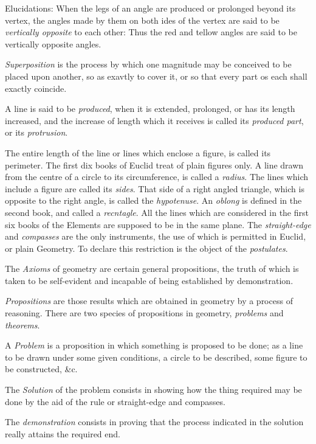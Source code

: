 \documentclass{article}
\begin{document}
Elucidations: 
When the legs of an angle are produced or prolonged beyond its vertex, the angles made by them on both ides of the vertex are said to be \textit{vertically opposite} to each other: Thus the red and tellow angles are said to be vertically opposite angles. 

\textit{Superposition} is the process by which one magnitude may be conceived to be placed upon another, so as exavtly to cover it, or so that every part os each shall exactly coincide. 

A line is said to be \textit{produced}, when it is extended, prolonged, or has its length increased, and the increase of length which it receives is called its \textit{produced part}, or its \textit{protrusion}. 

The entire length of the line or lines which enclose a figure, is called its perimeter. The first dix books of Euclid treat of plain figures only. A line drawn from the centre of a circle to its circumference, is called a \textit{radius}. The lines which include a figure are called its \textit{sides}. That side of a right angled triangle, which is opposite to the right angle, is called the \textit{hypotenuse}. An \textit{oblong} is defined in the second book, and called a \textit{recntagle}. All the lines which are considered in the first six books of the Elements are supposed to be in the same plane. 
The \textit{straight-edge} and \textit{compasses} are the only instruments, the use of which is permitted in Euclid, or plain Geometry. To declare this restriction is the object of the \textit{postulates}. 

The \textit{Axioms} of geometry are certain general propositions, the truth of which is taken to be self-evident and incapable of being established by demonstration. 

\textit{Propositions} are those results which are obtained in geometry by a process of reasoning. There are two species of propositions in geometry, \textit{problems} and \textit{theorems}. 

A \textit{Problem} is a proposition in which something is proposed to be done; as a line to be drawn under some given conditions, a circle to be described, some figure to be constructed, \&c. 

The \textit{Solution} of the problem consists in showing how the thing required may be done by the aid of the rule or straight-edge and compasses. 

The \textit{demonstration} consists in proving that the process indicated in the solution really attains the required end. 
\end{document}
